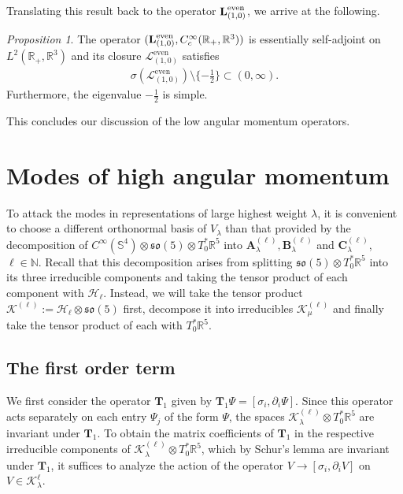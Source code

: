 \documentclass[11pt,reqno]{amsart}
\theoremstyle{remark}
\newtheorem{prop}{Proposition}[section]
\newcommand{\R}{\mathbb{R}}
\newcommand{\Lf}{\textup{\textbf{L}}}
\theoremstyle{definition}
\newcommand{\sov}{\mathfrak{so}(5)}
\begin{document}
Translating this result back to the operator $\Lf_{(1,0)}^{\mathrm{even}}$, we arrive at the following.
\begin{prop}
The operator  $(\Lf_{(1,0)}^{\mathrm{even}},C^\infty_c(\R_+,\R^3))$ is essentially self-adjoint on $L^2(\R_+,\R^3)$ and its closure $\mathcal{L}_{(1,0)}^{\mathrm{even}}$ satisfies
\begin{align*}
\sigma (\mathcal{L}_{(1,0)}^{\mathrm{even}})\setminus\{-\frac12\}\subset (0,\infty).
\end{align*}
 Furthermore, the eigenvalue $-\frac12$ is simple.
\end{prop}


This concludes our discussion of the low angular momentum operators.
\section{Modes of high angular momentum}
\label{sec:high_modes}

To attack the modes in representations of large highest weight $\lambda$, it is convenient to choose a different orthonormal basis of $V_\lambda$ than that provided by the decomposition of $C^\infty(\mathbb S^4) \otimes \sov \otimes T^\ast_0 \mathbb R^5$ into $\mathbf A^{(\ell)}_\lambda, \mathbf B^{(\ell)}_\lambda$ and $\mathbf C^{(\ell)}_\lambda$, $\ell \in \mathbb N$. Recall that this decomposition arises from splitting $\sov \otimes T^\ast_0 \mathbb R^5$ into its three irreducible components and taking the tensor product of each component with $\mathcal H_\ell$. Instead, we will take the tensor product $\mathcal K^{(\ell)} := \mathcal H_\ell \otimes \sov$ first, decompose it into irreducibles $\mathcal K^{(\ell)}_{\mu}$ and finally take the tensor product of each with $T_0^\ast \mathbb R^5$.

\subsection{The first order term}

We first consider the operator $\mathbf T_1$ given by $\mathbf T_1 \Psi = [\sigma_i,\partial_i \Psi]$. Since this operator acts separately on each entry $\Psi_j$ of the form $\Psi$, the spaces $\mathcal K^{(\ell)}_\lambda \otimes T^\ast_0 \mathbb R^5$ are invariant under $\mathbf T_1$. To obtain the matrix coefficients of $\mathbf T_1$ in the respective irreducible components of $\mathcal K^{(\ell)}_\lambda \otimes T^\ast_0 \mathbb R^5$, which by Schur's lemma are invariant under $\mathbf T_1$, it suffices to analyze the action of the operator $V \to [\sigma_i,\partial_i V]$ on $V \in \mathcal K^\ell_{\lambda}$.
\end{document}
